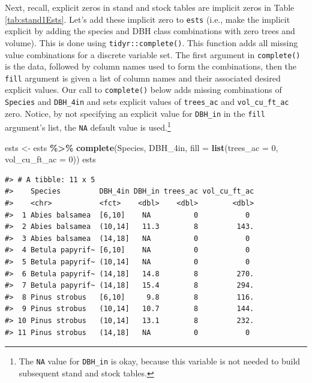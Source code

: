 \documentclass[
  11pt,
]{krantz}
\newenvironment{Shaded}{\begin{snugshade}}{\end{snugshade}}
\newcommand{\DataTypeTok}[1]{\textcolor[rgb]{0.13,0.29,0.53}{#1}}
\newcommand{\DecValTok}[1]{\textcolor[rgb]{0.00,0.00,0.81}{#1}}
\newcommand{\KeywordTok}[1]{\textcolor[rgb]{0.13,0.29,0.53}{\textbf{#1}}}
\newcommand{\NormalTok}[1]{#1}
\newcommand{\OperatorTok}[1]{\textcolor[rgb]{0.81,0.36,0.00}{\textbf{#1}}}
\newcommand{\StringTok}[1]{\textcolor[rgb]{0.31,0.60,0.02}{#1}}
\theoremstyle{definition}
\theoremstyle{definition}
\theoremstyle{definition}
\theoremstyle{definition}
\theoremstyle{remark}
\begin{document}
Next, recall, explicit zeros in stand and stock tables are implicit zeros in Table \ref{tab:stand1Ests}. Let's add these implicit zero to \texttt{ests} (i.e., make the implicit explicit by adding the species and DBH class combinations with zero trees and volume). This is done using \texttt{tidyr::complete()}. This function adds all missing value combinations for a discrete variable set. The first argument in \texttt{complete()} is the data, followed by column names used to form the combinations, then the \texttt{fill} argument is given a list of column names and their associated desired explicit values. Our call to \texttt{complete()} below adds missing combinations of \texttt{Species} and \texttt{DBH\_4in} and sets explicit values of \texttt{trees\_ac} and \texttt{vol\_cu\_ft\_ac} zero. Notice, by not specifying an explicit value for \texttt{DBH\_in} in the \texttt{fill} argument's list, the \texttt{NA} default value is used.\footnote{The \texttt{NA} value for \texttt{DBH\_in} is okay, because this variable is not needed to build subsequent stand and stock tables.}

\begin{Shaded}
\begin{Highlighting}[]
\NormalTok{ests \textless{}{-}}\StringTok{ }\NormalTok{ests }\OperatorTok{\%\textgreater{}\%}
\StringTok{  }\KeywordTok{complete}\NormalTok{(Species, DBH\_4in, }\DataTypeTok{fill =} \KeywordTok{list}\NormalTok{(}\DataTypeTok{trees\_ac =} \DecValTok{0}\NormalTok{, }\DataTypeTok{vol\_cu\_ft\_ac =} \DecValTok{0}\NormalTok{))}
\NormalTok{ests}
\end{Highlighting}
\end{Shaded}

\begin{verbatim}
#> # A tibble: 11 x 5
#>    Species         DBH_4in DBH_in trees_ac vol_cu_ft_ac
#>    <chr>           <fct>    <dbl>    <dbl>        <dbl>
#>  1 Abies balsamea  [6,10]    NA          0           0 
#>  2 Abies balsamea  (10,14]   11.3        8         143.
#>  3 Abies balsamea  (14,18]   NA          0           0 
#>  4 Betula papyrif~ [6,10]    NA          0           0 
#>  5 Betula papyrif~ (10,14]   NA          0           0 
#>  6 Betula papyrif~ (14,18]   14.8        8         270.
#>  7 Betula papyrif~ (14,18]   15.4        8         294.
#>  8 Pinus strobus   [6,10]     9.8        8         116.
#>  9 Pinus strobus   (10,14]   10.7        8         144.
#> 10 Pinus strobus   (10,14]   13.1        8         232.
#> 11 Pinus strobus   (14,18]   NA          0           0
\end{verbatim}
\end{document}
